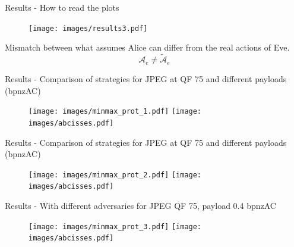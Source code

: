 \documentclass[10pt,aspectratio=169]{beamer}
\begin{document}










\begin{frame}{Results - How to read the plots }
    \begin{figure}
        \texttt{[image: images/results3.pdf]}
    \end{figure}

    \pause

    Mismatch between what assumes Alice can differ from the real actions of Eve. 
    $$ \mathcal{A}_e \neq \tilde{\mathcal{A}}_e $$

\end{frame}


\begin{frame}{Results - Comparison of strategies for JPEG at QF 75 and different payloads (bpnzAC)}
    \begin{figure}
        \texttt{[image: images/minmax\_prot\_1.pdf]}
        \texttt{[image: images/abcisses.pdf]}
    \end{figure}
\end{frame}

\begin{frame}{Results - Comparison of strategies for JPEG at QF 75 and different payloads (bpnzAC)}
    \begin{figure}
        \texttt{[image: images/minmax\_prot\_2.pdf]}
        \texttt{[image: images/abcisses.pdf]}
    \end{figure}
\end{frame}

\begin{frame}{Results - With different adversaries for JPEG QF 75, payload 0.4 bpnzAC}
    \begin{figure}
        \texttt{[image: images/minmax\_prot\_3.pdf]}
        \texttt{[image: images/abcisses.pdf]}
    \end{figure}
\end{frame}
\end{document}

